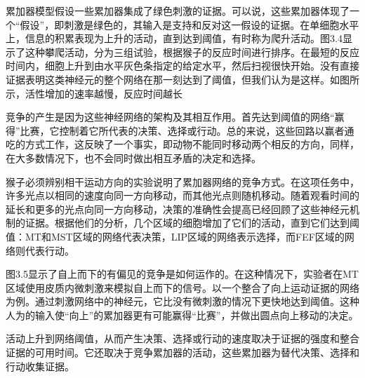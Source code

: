 累加器模型假设一些累加器集成了绿色刺激的证据。可以说，这些累加器体现了一个“假设”，即刺激是绿色的，其输入是支持和反对这一假设的证据。在单细胞水平上，信息的积累表现为上升的活动，直到达到阈值，有时称为爬升活动。图3.4显示了这种攀爬活动，分为三组试验，根据猴子的反应时间进行排序。在最短的反应时间内，细胞上升到由水平灰色条指定的给定水平，然后扫视很快开始。没有直接证据表明这类神经元的整个网络在那一刻达到了阈值，但我们认为是这样。如图所示，活性增加的速率越慢，反应时间越长\par
竞争的产生是因为这些神经网络的架构及其相互作用。首先达到阈值的网络“赢得”比赛，它控制着它所代表的决策、选择或行动。总的来说，这些回路以赢者通吃的方式工作，这反映了一个事实，即动物不能同时移动两个相反的方向，同样，在大多数情况下，也不会同时做出相互矛盾的决定和选择。\par
猴子必须辨别相干运动方向的实验说明了累加器网络的竞争方式。在这项任务中，许多光点以相同的速度向同一方向移动，而其他光点则随机移动。随着观看时间的延长和更多的光点向同一方向移动，决策的准确性会提高\cite{Gold&Shadlen 2007}已经回顾了这些神经元机制的证据。根据他们的分析，几个区域的细胞增加了它们的活动，直到它们达到阈值：MT和MST区域的网络代表决策，LIP区域的网络表示选择，而FEF区域的网络则代表行动\cite{Kim&Shadlen,1999}。\par
图3.5显示了自上而下的有偏见的竞争是如何运作的。在这种情况下，实验者在MT区域使用皮质内微刺激来模拟自上而下的信号。以一个整合了向上运动证据的网络为例。通过刺激网络中的神经元，它比没有微刺激的情况下更快地达到阈值。这种人为的输入使“向上”的累加器更有可能赢得“比赛”，并做出圆点向上移动的决定。\par
活动上升到网络阈值，从而产生决策、选择或行动的速度取决于证据的强度和整合证据的可用时间。它还取决于竞争累加器的活动，这些累加器为替代决策、选择和行动收集证据。\par
